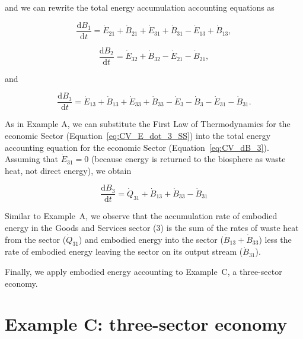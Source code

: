 \noindent and we can rewrite 
the total energy accumulation accounting equations as

\begin{equation} \label{eq:CV_dB_1}
	\frac{\mathrm{d}B_{1}}{\mathrm{d}t} 
	= \dot{E}_{21} 
	+ \dot{B}_{21} 
	+ \dot{E}_{31} 
	+ \dot{B}_{31} 
	- \dot{E}_{13} 
	+ \dot{B}_{13},
\end{equation}

\begin{equation} \label{eq:CV_dB_2}
	\frac{\mathrm{d}B_{2}}{\mathrm{d}t} 
	= \dot{E}_{32} 
	+ \dot{B}_{32} 
	- \dot{E}_{21} 
	- \dot{B}_{21},
\end{equation}

\noindent and 

\begin{equation} \label{eq:CV_dB_3}
	\frac{\mathrm{d}B_{3}}{\mathrm{d}t} 
	= \dot{E}_{13} 
	+ \dot{B}_{13} 
	+ \dot{E}_{33} 
	+ \dot{B}_{33} 
	- \dot{E}_{3} 
	- \dot{B}_{3} 
	- \dot{E}_{31} 
	- \dot{B}_{31}.
\end{equation}

As in Example A, we can substitute the First Law of Thermodynamics 
for the economic Sector (Equation~\ref{eq:CV_E_dot_3_SS}) 
into the total energy accounting equation for the economic Sector 
(Equation~\ref{eq:CV_dB_3}). 
Assuming that $\dot{E}_{31} = 0$ 
(because energy is returned to the biosphere as waste heat, 
not direct energy), we obtain

\begin{equation} \label{eq:ExB_embodied_energy_accounting}
	\frac{\mathrm{d}B_3}{\mathrm{d}t} 
	= \dot{Q}_{31} 
	+ \dot{B}_{13} 
	+ \dot{B}_{33} 
	- \dot{B}_{31}
\end{equation}

Similar to Example~A, we observe that the accumulation rate 
of embodied energy in the Goods and Services sector (3) 
is the sum of the rates of waste heat from the sector 
($\dot{Q}_{31}$) and embodied energy into the sector 
($\dot{B}_{13} + \dot{B}_{33}$) 
less the rate of embodied energy leaving the sector 
on its output stream ($\dot{B}_{31}$).

Finally, we apply embodied energy accounting to 
Example~C, a three-sector economy.


\section{Example C: three-sector economy}

